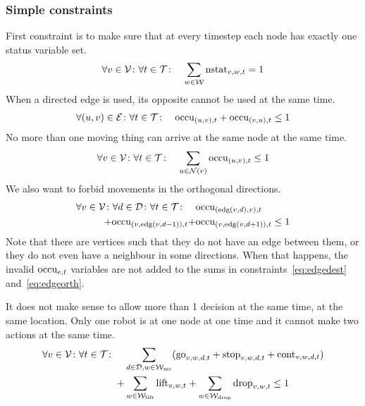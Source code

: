 \subsubsection{Simple constraints}
\label{sec:simple}
First constraint is to make sure that at every timestep each node has exactly
one status variable set.
\begin{align}
    &\forall v \in \mathcal{V} \colon \forall t \in \mathcal{T} \colon & \sum_{w \in \mathcal{W}}
    \mathrm{nstat}_{v,w,t} = 1
\end{align}
When a directed edge is used, its opposite cannot be used at the same time.
\begin{align}
    &\forall (u,v) \in \mathcal{E} \colon \forall t \in \mathcal{T} \colon & \mathrm{occu}_{(u,v),t} +
    \mathrm{occu}_{(v,u),t} \leq 1
\end{align}
No more than one moving thing can arrive at the same node at the same time.
\begin{align}
    \label{eq:edgedest}
    &\forall v \in \mathcal{V} \colon \forall t \in \mathcal{T} \colon & \sum_{u \in \mathcal{N}(v)}
    \mathrm{occu}_{(u,v),t} \leq 1
\end{align}
We also want to forbid movements in the orthogonal directions.
\begin{equation}
    \begin{split}
        \label{eq:edgeorth}
        \forall v \in \mathcal{V} \colon \forall d \in \mathcal{D} \colon \forall t \in \mathcal{T} \colon
        \quad & \mathrm{occu}_{(\mathrm{edg}(v,d),v),t} \\ + \mathrm{occu}_{(v,\mathrm{edg}(v,d-1)),t} + &
        \mathrm{occu}_{(v,\mathrm{edg}(v,d+1)),t} \leq 1
    \end{split}
\end{equation}
Note that there are vertices such that they do not have an edge between them, or
they do not even have a neighbour in some directions. When that happens, the
invalid $\mathrm{occu}_{e,t}$ variables are not added to the sums in
constraints~\eqref{eq:edgedest} and~\eqref{eq:edgeorth}.

It does not make sense to allow more than 1 decision at the same time, at
the same location. Only one robot is at one node at one time and it cannot make
two actions at the same time.
\begin{equation}
    \begin{split}
        \forall v \in \mathcal{V} \colon \forall t \in \mathcal{T} \colon \quad & \sum_{d \in \mathcal{D},
        w \in \mathcal{W}_\mathrm{mc}}(\mathrm{go}_{v,w,d,t} + \mathrm{stop}_{v,w,d,t} + \mathrm{cont}_{v,w,d,t}) \\ + &
        \sum_{w \in \mathcal{W}_\mathrm{lift}} \mathrm{lift}_{v,w,t} + \sum_{w \in \mathcal{W}_\mathrm{drop}} \mathrm{drop}_{v,w,t} \leq 1
    \end{split}
\end{equation}

